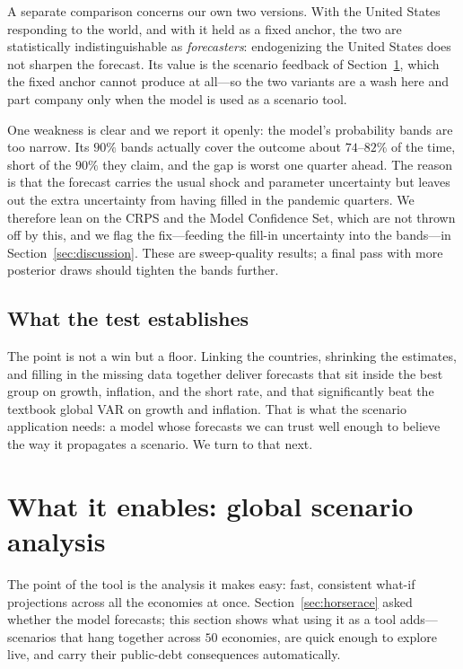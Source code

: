 \documentclass[11pt]{article}
\begin{document}
A separate comparison concerns our own two versions. With the United States responding to the world, and
with it held as a fixed anchor, the two are statistically indistinguishable as \emph{forecasters}:
endogenizing the United States does not sharpen the forecast. Its value is the scenario feedback of
Section~\ref{sec:scenario}, which the fixed anchor cannot produce at all---so the two variants are a wash
here and part company only when the model is used as a scenario tool.

One weakness is clear and we report it openly: the model's probability bands are too narrow. Its
$90\%$ bands actually cover the outcome about $74$--$82\%$ of the time, short of the $90\%$ they claim, and
the gap is worst one quarter ahead. The reason is that the forecast carries the usual shock and
parameter uncertainty but leaves out the extra uncertainty from having filled in the pandemic quarters. We
therefore lean on the CRPS and the Model Confidence Set, which are not thrown off by this, and we flag the
fix---feeding the fill-in uncertainty into the bands---in Section~\ref{sec:discussion}. These are
sweep-quality results; a final pass with more posterior draws should tighten the bands further.

\subsection{What the test establishes}
\label{sub:eval-summary}

The point is not a win but a floor. Linking the countries, shrinking the estimates, and filling in the
missing data together deliver forecasts that sit inside the best group on growth, inflation, and the short
rate, and that significantly beat the textbook global VAR on growth and inflation. That is what the
scenario application needs: a model whose forecasts we can trust well enough to believe the way it
propagates a scenario. We turn to that next.

\section{What it enables: global scenario analysis}
\label{sec:scenario}

The point of the tool is the analysis it makes easy: fast, consistent what-if projections across all the
economies at once. Section~\ref{sec:horserace} asked whether the model forecasts; this section shows what
using it as a tool adds---scenarios that hang together across $50$ economies, are quick enough to explore
live, and carry their public-debt consequences automatically.
\end{document}
